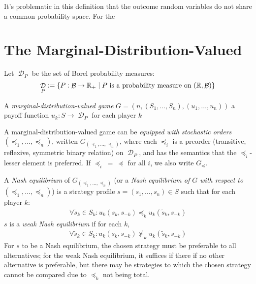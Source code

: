 \documentclass[a4paper]{scrreprt}
\DeclareMathOperator{\D}{\mathcal{D}}
\DeclareMathOperator{\B}{\mathcal{B}}
\DeclareMathOperator{\releq}{\;=\;}
\begin{document}
    It's problematic in this definition that the outcome random variables do not share a common probability space.
    For the 



    \section{The Marginal-Distribution-Valued}
    \label{sec:marginalDistributionValued}
    Let $\D_P$ be the set of Borel probability measures:    
    \[ \D_P := \set{P: \B \to \R_+ \mid P \text{ is a probability measure on } (\R, \B)} \]
    
    \begin{defn}
        A \emph{marginal-distribution-valued game} $G = (n, (S_1, \dots, S_n), (u_1, \dots, u_n))$ a payoff function $u_k: S \to \D_P$ for each player $k$
    
        A marginal-distribution-valued game can be \emph{equipped with stochastic orders} $(\preccurlyeq_1, \dots, \preccurlyeq_n)$, written $G_{(\preccurlyeq_1, \dots, \preccurlyeq_n)}$, where each $\preccurlyeq_i$ is a preorder (transitive, reflexive, symmetric binary relation) on $\D_P$,
        and has the semantics that the $\preccurlyeq_i$-lesser element is preferred.
        If $\preccurlyeq_i \releq \preccurlyeq$ for all $i$, we also write $G_\preccurlyeq$.
    \end{defn}
    
    \begin{defn}
        A \emph{Nash equilibrium} of $G_{(\preccurlyeq_1, \dots, \preccurlyeq_n)}$ (or a \emph{Nash equilibrium of $G$ with respect to $(\preccurlyeq_1, \dots, \preccurlyeq_n)$})
        is a strategy profile $s = (s_1, \dots, s_n) \in S$ such that for each player $k$:
        \begin{gather}
            \forall \tilde{s}_k \in S_k: u_k(s_k, s_{-k}) \preccurlyeq_k u_k(\tilde{s}_k, s_{-k})
        \end{gather}
        $s$ is a 
        \emph{weak Nash equilibrium} if for each $k$,
        \begin{gather}
            \forall \tilde{s}_k \in S_k: u_k(s_k, s_{-k}) \nsucc_k u_k(\tilde{s}_k, s_{-k})
        \end{gather}
        For $s$ to be a Nash equilibrium, the chosen strategy must be preferable to all alternatives; for the weak Nash equilibrium, it suffices if there if no other alternative is preferable, but there may be strategies to which the chosen strategy cannot be compared due to $\preccurlyeq_k$ not being total. 
    \end{defn}
    
\end{document}
